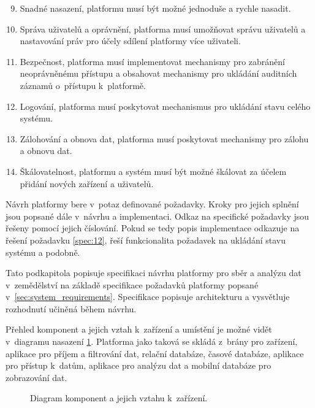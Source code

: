 \begin{enumerate}
  \setcounter{enumi}{8}
  \item Snadné nasazení, platformu musí být možné jednoduše a rychle nasadit. \label{spec:9}
  \item Správa uživatelů a oprávnění, platforma musí umožňovat správu uživatelů a nastavování práv pro účely sdílení platformy více uživateli. \label{spec:10}
  \item Bezpečnost, platforma musí implementovat mechanismy pro zabránění neoprávněnému přístupu a obsahovat mechanismy pro ukládání auditních záznamů o~přístupu k~platformě. \label{spec:11}
  \item Logování, platforma musí poskytovat mechanismus pro ukládání stavu celého systému. \label{spec:12}
  \item Zálohování a obnova dat, platforma musí poskytovat mechanismy pro zálohu a obnovu dat. \label{spec:13}
  \item Škálovatelnost, platformu a systém musí být možné škálovat za účelem přidání nových zařízení a uživatelů. \label{spec:14}
\end{enumerate}
Návrh platformy bere v~potaz definované požadavky. Kroky pro jejich splnění jsou popsané dále v~návrhu a implementaci. Odkaz na specifické požadavky jsou řešeny pomocí jejich číslování. Pokud se tedy popis implementace odkazuje na řešení požadavku \ref{spec:12}, řeší funkcionalita požadavek na ukládání stavu systému a podobně.

Tato podkapitola popisuje specifikaci návrhu platformy pro sběr a analýzu dat v~zemědělství na základě specifikace požadavků platformy popsané v~\ref{sec:system_requirements}. Specifikace popisuje architekturu a vysvětluje rozhodnutí učiněná během návrhu. 

Přehled komponent a jejich vztah k~zařízení a umístění je možné vidět v~diagramu nasazení \ref{dia:system_components}. Platforma jako taková se skládá z~brány pro zařízení, aplikace pro příjem a filtrování dat, relační databáze, časové databáze, aplikace pro přístup k~datům, aplikace pro analýzu dat a mobilní databáze pro zobrazování dat.

\begin{figure}[ht]
  \centering
  
  \caption{Diagram komponent a jejich vztahu k~zařízení.}
  \label{dia:system_components}
\end{figure}

